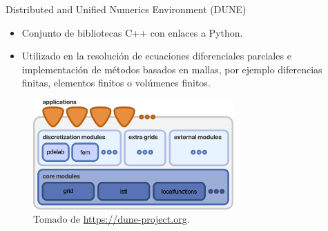 \begin{frame}
\begin{alertblock}{Distributed and Unified Numerics Environment (DUNE)}
\begin{itemize}
			\item

			      Conjunto de bibliotecas C++ con enlaces a Python.


			\item

			      Utilizado en la resolución de ecuaciones diferenciales parciales e implementación de métodos basados en mallas, por ejemplo diferencias finitas, elementos finitos o volúmenes finitos.
		\end{itemize}
	\end{alertblock}

	\begin{figure}[ht!]
		\centering
		\includegraphics[height=4.2cm]{dunedesign}
		\caption{Tomado de \url{https://dune-project.org}.}
	\end{figure}

\end{frame}

